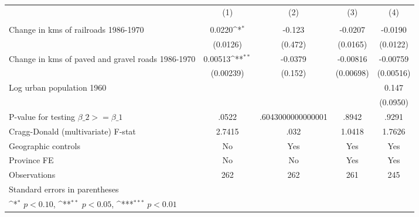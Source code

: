 {
\def\sym#1{\ifmmode^{#1}\else\(^{#1}\)\fi}
\begin{tabular}{l*{4}{c}}
\hline\hline
                &\multicolumn{1}{c}{(1)}&\multicolumn{1}{c}{(2)}&\multicolumn{1}{c}{(3)}&\multicolumn{1}{c}{(4)}\\
                &\multicolumn{1}{c}{}&\multicolumn{1}{c}{}&\multicolumn{1}{c}{}&\multicolumn{1}{c}{}\\
\hline
Change in kms of railroads 1986-1970&   0.0220\sym{*}  &   -0.123         &  -0.0207         &  -0.0190         \\
                & (0.0126)         &  (0.472)         & (0.0165)         & (0.0122)         \\
[1em]
Change in kms of paved and gravel roads 1986-1970&  0.00513\sym{**} &  -0.0379         & -0.00816         & -0.00759         \\
                &(0.00239)         &  (0.152)         &(0.00698)         &(0.00516)         \\
[1em]
Log urban population 1960&                  &                  &                  &    0.147         \\
                &                  &                  &                  & (0.0950)         \\
\hline
P-value for testing $\beta\_{2} >= \beta\_{1}$&    .0522         &.6043000000000001         &    .8942         &    .9291         \\
Cragg-Donald (multivariate) F-stat&   2.7415         &     .032         &   1.0418         &   1.7626         \\
Geographic controls&       No         &      Yes         &      Yes         &      Yes         \\
Province FE     &       No         &       No         &      Yes         &      Yes         \\
Observations    &      262         &      262         &      261         &      245         \\
\hline\hline
\multicolumn{5}{l}{\footnotesize Standard errors in parentheses}\\
\multicolumn{5}{l}{\footnotesize \sym{*} \(p<0.10\), \sym{**} \(p<0.05\), \sym{***} \(p<0.01\)}\\
\end{tabular}
}
